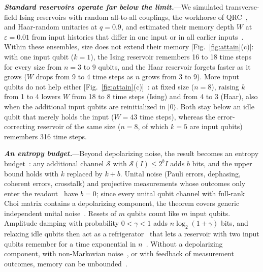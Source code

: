 \documentclass[aps,prl,twocolumn,superscriptaddress,floatfix]{revtex4-2}
\theoremstyle{plain}
\newcommand{\ket}[1]{|#1\rangle}
\newcommand{\runin}[1]{\textit{\textbf{#1}}---}
\begin{document}
\runin{Standard reservoirs operate far below the limit.}We simulated transverse-field Ising reservoirs with random all-to-all couplings, the workhorse of QRC~\cite{Fujii2017,Nakajima2019,MartinezPena2021}, and Haar-random unitaries at $q=0.9$, and estimated their memory depth $W$ at $\varepsilon=0.01$ from input histories that differ in one input or in all earlier inputs~\cite{SM}. Within these ensembles, size does not extend their memory [Fig.~\ref{fig:attain}(c)]: with one input qubit ($k=1$), the Ising reservoir remembers 16 to 18 time steps for every size from $n=3$ to $9$ qubits, and the Haar reservoir forgets faster as it grows ($W$ drops from 9 to 4 time steps as $n$ grows from 3 to 9). More input qubits do not help either [Fig.~\ref{fig:attain}(c)]~\cite{SM}: at fixed size ($n=8$), raising $k$ from 1 to 4 lowers $W$ from 18 to 8 time steps (Ising) and from 4 to 3 (Haar), also when the additional input qubits are reinitialized in $\ket0$. Both stay below an idle qubit that merely holds the input ($W=43$ time steps), whereas the error-correcting reservoir of the same size ($n=8$, of which $k=5$ are input qubits) remembers 316 time steps.

\runin{An entropy budget.}Beyond depolarizing noise, the result becomes an entropy budget~\cite{SM}: any additional channel $\mathcal S$ with $\mathcal S(I)\le2^bI$ adds $b$ bits, and the upper bound holds with $k$ replaced by $k+b$. Unital noise (Pauli errors, dephasing, coherent errors, crosstalk) and projective measurements whose outcomes only enter the readout~\cite{Mujal2023} have $b=0$; since every unital qubit channel with full-rank Choi matrix contains a depolarizing component, the theorem covers generic independent unital noise~\cite{SM}. Resets of $m$ qubits count like $m$ input qubits. Amplitude damping with probability $0<\gamma<1$ adds $n\log_2(1+\gamma)$ bits, and relaxing idle qubits then act as a refrigerator~\cite{BenOr2013} that lets a reservoir with two input qubits remember for a time exponential in $n$~\cite{SM,Hoeffding1963}. Without a depolarizing component, with non-Markovian noise~\cite{Sannia2026}, or with feedback of measurement outcomes, memory can be unbounded~\cite{SM}.
\end{document}
